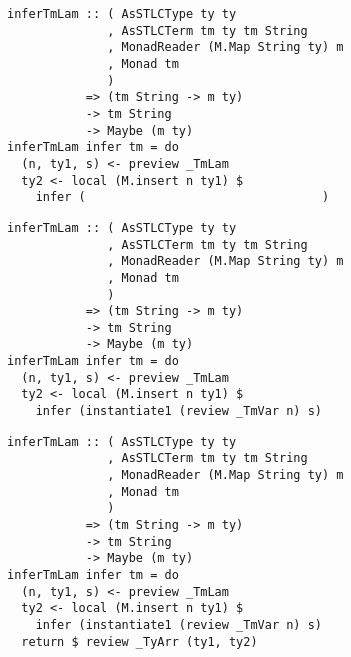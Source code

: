 \documentclass[aspectration=169]{beamer}
\begin{document}
\begin{frame}[fragile]
\begin{overprint}
\begin{verbatim}
  \end{verbatim}  
  \begin{verbatim}
inferTmLam :: ( AsSTLCType ty ty
              , AsSTLCTerm tm ty tm String
              , MonadReader (M.Map String ty) m
              , Monad tm
              )
           => (tm String -> m ty)
           -> tm String
           -> Maybe (m ty)
inferTmLam infer tm = do
  (n, ty1, s) <- preview _TmLam
  ty2 <- local (M.insert n ty1) $
    infer (                                 )

  \end{verbatim}  
  \begin{verbatim}
inferTmLam :: ( AsSTLCType ty ty
              , AsSTLCTerm tm ty tm String
              , MonadReader (M.Map String ty) m
              , Monad tm
              )
           => (tm String -> m ty)
           -> tm String
           -> Maybe (m ty)
inferTmLam infer tm = do
  (n, ty1, s) <- preview _TmLam
  ty2 <- local (M.insert n ty1) $
    infer (instantiate1 (review _TmVar n) s)

  \end{verbatim}  
  \begin{verbatim}
inferTmLam :: ( AsSTLCType ty ty
              , AsSTLCTerm tm ty tm String
              , MonadReader (M.Map String ty) m
              , Monad tm
              )
           => (tm String -> m ty)
           -> tm String
           -> Maybe (m ty)
inferTmLam infer tm = do
  (n, ty1, s) <- preview _TmLam
  ty2 <- local (M.insert n ty1) $
    infer (instantiate1 (review _TmVar n) s)
  return $ review _TyArr (ty1, ty2)
  \end{verbatim}  
  \end{overprint}
\end{frame}
\end{document}
